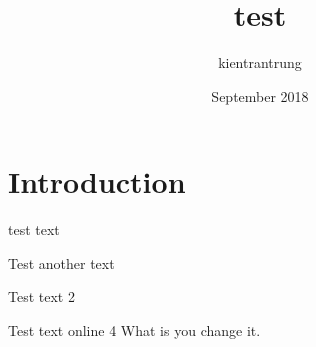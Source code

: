 \documentclass{article}
\title{test}
\author{kientrantrung }
\date{September 2018}
\begin{document}
\maketitle

\section{Introduction}
test text

Test another text

Test text 2

Test text online 4
What is you change it.
\end{document}
